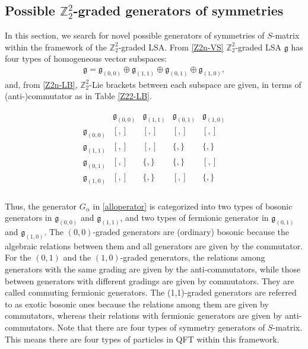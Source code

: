 \documentclass[a4paper,12pt]{article}
\def\Z{\mathbb{Z}}
\def\ua{\alpha}
\def\g{\mathfrak{g}}
\theoremstyle{plain}
\theoremstyle{definition}
\begin{document}
\subsection{Possible $\Z_2^2$-graded generators of symmetries}
In this section, we search for novel possible generators of symmetries of $S$-matrix within the framework of the $\Z_2^2$-graded LSA.
From \eqref{Z2n-VS} $\Z_2^2$-graded LSA $\g$ has four types of homogeneous vector subspaces:
\begin{align}
 \g=\g_{(0,0)}\oplus\g_{(1,1)}\oplus\g_{(0,1)}\oplus\g_{(1,0)},
\end{align}
and, from \eqref{Z2n-LB}, $\Z_2^2$-Lie brackets between each subspace are given, in terms of (anti-)commutator as in Table \ref{Z22-LB}.
\begin{table}[h]
 \begin{align*}
  \begin{array}{c|cccc}
   & \g_{(0,0)}& \g_{(1,1)}& \g_{(0,1)}& \g_{(1,0)}\\ \hline
   \g_{(0,0)}& [,]& [,]& [,]& [,]\\
   \g_{(1,1)}& [,]& [,]& \{,\}& \{,\}\\ 
   \g_{(0,1)}& [,]& \{,\}& \{,\}& [,]\\
   \g_{(1,0)}& [,]& \{,\}& [,]& \{,\}\\
  \end{array}
 \end{align*}
\caption{$\Z_2^2$-Lie brackets between each subspace}
\label{Z22-LB}
\end{table}

\noindent Thus, the generator $G_{\ua}$ in \eqref{alloperator} is categorized into two types of bosonic generators in $\g_{(0,0)}$ and $\g_{(1,1)}$, and two types of fermionic generator in $\g_{(0,1)}$ and $\g_{(1,0)}$. The $(0,0)$-graded generators are (ordinary) bosonic because the algebraic relations between them and all generators are given by the commutator. 
For the $(0,1)$ and the $(1,0)$-graded generators, the relations among generators with the same grading are given by the anti-commutators, while those between generators with different gradings are given by commutators. They are called commuting fermionic generators.
The (1,1)-graded generators are referred to as exotic bosonic ones because the relations among them are given by commutators, whereas their relations with fermionic generators are given by anti-commutators. 
Note that there are four types of symmetry generators of $S$-matrix.
This means there are four types of particles in QFT within this framework. %
\end{document}
